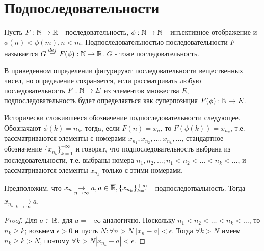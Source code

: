 \documentclass[main]{subfiles}
\begin{document}
\section{Подпоследовательности}
\begin{definition}
    Пусть $F: \mathbb{N} \to \mathbb{R}$ - последовательность, $\phi: \mathbb{N} \to \mathbb{N}$ - 
    инъективное отображение и $\phi(n) < \phi(m), n < m$.
    Подпоследовательностью последовательности $F$ называется 
    $G \overset{def}{=} F(\phi): \mathbb{N} \to \mathbb{R}$. $G$ - тоже последовательность.

    В приведенном определении фигурируют последовательности вещественных 
    чисел, но определение сохраняется, если рассматривать любую последовательность
    $F: \mathbb{N} \to E$ из элементов множества $E$, подпоследовательность будет 
    определяяться как суперпозиция $F(\phi): \mathbb{N} \to E$.
    
    Исторически сложившееся обозначение подпоследовательности следующее.
    Обозначают $\phi(k) = n_k$, тогдa, если $F(n) = x_n$, то $F(\phi(k)) = x_{n_k}$,
    т.е. рассматриваются элементы с номерами $x_{n_1}, x_{n_2}, \ldots, x_{n_k},
    \ldots$, стандартное обозначение $\{x_{n_k}\}_{k=1}^{+\infty}$ и
    говорят, что подпоследовательность выбрана из последовательности, т.е. 
    выбраны номера $n_1, n_2, \ldots; n_1 < n_2 < \ldots < n_k < \ldots$,
    и рассматриваются элементы $x_{n_k}$ только с этими номерами.
\end{definition}

\begin{assertion}
    Предположим, что $x_n \underset{n\to\infty}{\to} a, a \in \overline{\mathbb{R}},
    \{x_{n_k}\}_{k=1}^{+\infty}$ - подпоследотвальность. Тогда
    $x_{n_k} \underset{k\to\infty}{\to} a$.
\end{assertion}
\begin{proof}
    Для $a \in \mathbb{R}$, для $a = \pm\infty$ аналогично. Поскольку $n_1 < n_2 <
    \ldots < n_k < \ldots$, то $n_k \geq k$; возьмем $\epsilon > 0$ и пусть 
    $N : \forall n > N \; |x_n - a| < \epsilon$. Тогда $\forall k > N$ имеем
    $n_k \geq k > N$, поэтому $\forall k > N |x_{n_k} - a| < \epsilon$.
\end{proof}
\end{document}
